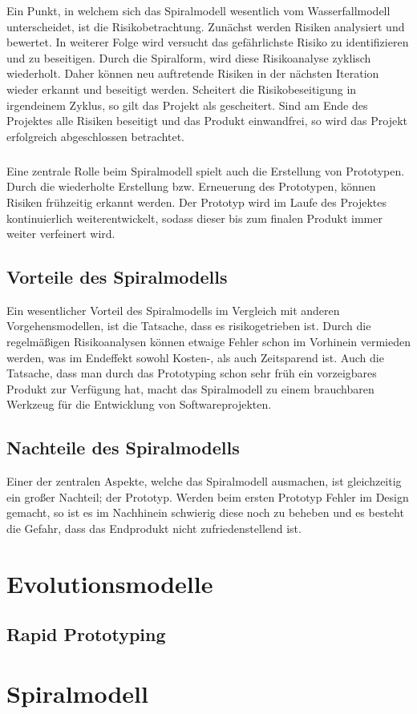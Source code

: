 \documentclass[a4paper, twopage]{scrreprt}
\begin{document}
Ein Punkt, in welchem sich das Spiralmodell wesentlich vom Wasserfallmodell unterscheidet, ist die Risikobetrachtung. Zunächst werden Risiken analysiert und bewertet. In weiterer Folge wird versucht das gefährlichste Risiko zu identifizieren und zu beseitigen.
Durch die Spiralform, wird diese Risikoanalyse zyklisch wiederholt. Daher können neu auftretende Risiken in der nächsten Iteration wieder erkannt und beseitigt werden. Scheitert die Risikobeseitigung in irgendeinem Zyklus, so gilt das Projekt als gescheitert. Sind am Ende des Projektes alle Risiken beseitigt und das Produkt einwandfrei, so wird das Projekt erfolgreich abgeschlossen betrachtet.
\paragraph*{}
Eine zentrale Rolle beim Spiralmodell spielt auch die Erstellung von Prototypen. Durch die wiederholte Erstellung bzw. Erneuerung des Prototypen, können Risiken frühzeitig erkannt werden. Der Prototyp wird im Laufe des Projektes kontinuierlich weiterentwickelt, sodass dieser bis zum finalen Produkt immer weiter verfeinert wird.
\section{Vorteile des Spiralmodells}
\label{sec:spiralmodell_vortile}
Ein wesentlicher Vorteil des Spiralmodells im Vergleich mit anderen Vorgehensmodellen, ist die Tatsache, dass es risikogetrieben ist. Durch die regelmäßigen Risikoanalysen können etwaige Fehler schon im Vorhinein vermieden werden, was im Endeffekt sowohl Kosten-, als auch Zeitsparend ist. Auch die Tatsache, dass man durch das Prototyping schon sehr früh ein vorzeigbares Produkt zur Verfügung hat, macht das Spiralmodell zu einem brauchbaren Werkzeug für die Entwicklung von Softwareprojekten.

\section{Nachteile des Spiralmodells}
\label{sec:spiralmodell_nachteile}
Einer der zentralen Aspekte, welche das Spiralmodell ausmachen, ist gleichzeitig ein großer Nachteil; der Prototyp. Werden beim ersten Prototyp Fehler im Design gemacht, so ist es im Nachhinein schwierig diese noch zu beheben und es besteht die Gefahr, dass das Endprodukt nicht zufriedenstellend ist.


\chapter{Evolutionsmodelle}

\section{Rapid Prototyping}

\chapter{Spiralmodell}


\nocite{*}
\printbibliography

\listoffigures
\end{document}

